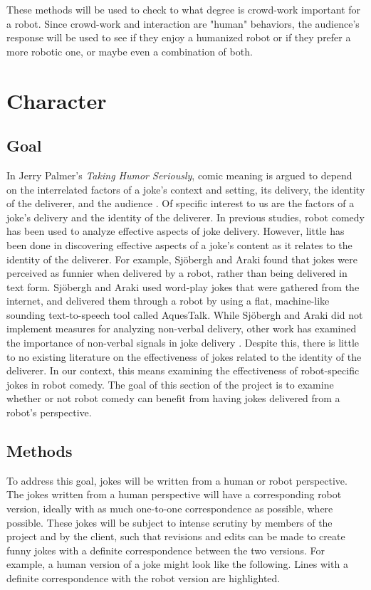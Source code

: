 \documentclass[onecolumn, draftclsnofoot,10pt, compsoc]{IEEEtran}
\begin{document}
These methods will be used to check to what degree is crowd-work important for a robot. Since crowd-work and interaction are "human" behaviors, the audience's response will be used to see if they enjoy a humanized robot or if they prefer a more robotic one, or maybe even a combination of both.


\section{Character}
\subsection{Goal}
In Jerry Palmer's \textit{Taking Humor Seriously}, comic meaning is argued to depend on the interrelated factors of a joke's context and setting, its delivery, the identity of the deliverer, and the audience \cite{Palmer:1993}.
Of specific interest to us are the factors of a joke's delivery and the identity of the deliverer.
In previous studies, robot comedy has been used to analyze effective aspects of joke delivery.
However, little has been done in discovering effective aspects of a joke's content as it relates to the identity of the deliverer.
For example, Sj\"{o}bergh and Araki \cite{RobotsMakeThings:2008} found that jokes were perceived as funnier when delivered by a robot, rather than being delivered in text form.
Sj\"{o}bergh and Araki used word-play jokes that were gathered from the internet, and delivered them through a robot by using a flat, machine-like sounding text-to-speech tool called AquesTalk.
While Sj\"{o}bergh and Araki did not implement measures for analyzing non-verbal delivery, other work has examined the importance of non-verbal signals in joke delivery \cite{KatevasRobot:2014} \cite{KnightEightLessons:2011}.
Despite this, there is little to no existing literature on the effectiveness of jokes related to the identity of the deliverer.
In our context, this means examining the effectiveness of robot-specific jokes in robot comedy.
The goal of this section of the project is to examine whether or not robot comedy can benefit from having jokes delivered from a robot's perspective.

\subsection{Methods}
To address this goal, jokes will be written from a human or robot perspective.
The jokes written from a human perspective will have a corresponding robot version, ideally with as much one-to-one correspondence as possible, where possible.
These jokes will be subject to intense scrutiny by members of the project and by the client, such that revisions and edits can be made to create funny jokes with a definite correspondence between the two versions.
For example, a human version of a joke might look like the following. Lines with a definite correspondence with the robot version are highlighted.
\end{document}
